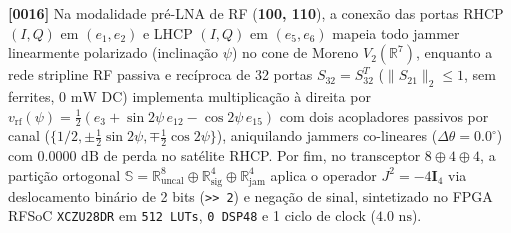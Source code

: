 \documentclass[12pt,a4paper]{article}
\begin{document}
\textbf{[0016]} Na modalidade pr\'e-LNA de RF (\textbf{100, 110}), a conex\~ao das portas RHCP $(I,Q)$ em $(e_1,e_2)$ e LHCP $(I,Q)$ em $(e_5,e_6)$ mapeia todo jammer linearmente polarizado (inclina\c{c}\~ao $\psi$) no cone de Moreno $V_2(\mathbb{R}^7)$, enquanto a rede stripline RF passiva e rec\'iproca de 32 portas $S_{32} = S_{32}^T$ ($\|S_{21}\|_2 \le 1$, sem ferrites, $0\text{ mW}$ DC) implementa multiplica\c{c}\~ao \`a direita por $v_{\mathrm{rf}}(\psi) = \frac{1}{2}(e_3 + \sin 2\psi\,e_{12} - \cos 2\psi\,e_{15})$ com dois acopladores passivos por canal ($\{1/2, \pm\frac{1}{2}\sin 2\psi, \mp\frac{1}{2}\cos 2\psi\}$), aniquilando jammers co-lineares ($\Delta\theta = 0.0^\circ$) com $0.0000\text{ dB}$ de perda no sat\'elite RHCP. Por fim, no transceptor $8\oplus 4\oplus 4$, a parti\c{c}\~ao ortogonal $\mathbb{S} = \mathbb{R}^8_{\mathrm{uncal}} \oplus \mathbb{R}^4_{\mathrm{sig}} \oplus \mathbb{R}^4_{\mathrm{jam}}$ aplica o operador $J^2 = -4\mathbf{I}_4$ via deslocamento bin\'ario de 2 bits (\texttt{>> 2}) e nega\c{c}\~ao de sinal, sintetizado no FPGA RFSoC \texttt{XCZU28DR} em \texttt{512 LUTs}, \texttt{0 DSP48} e 1 ciclo de clock ($4.0\text{ ns}$).
\end{document}

